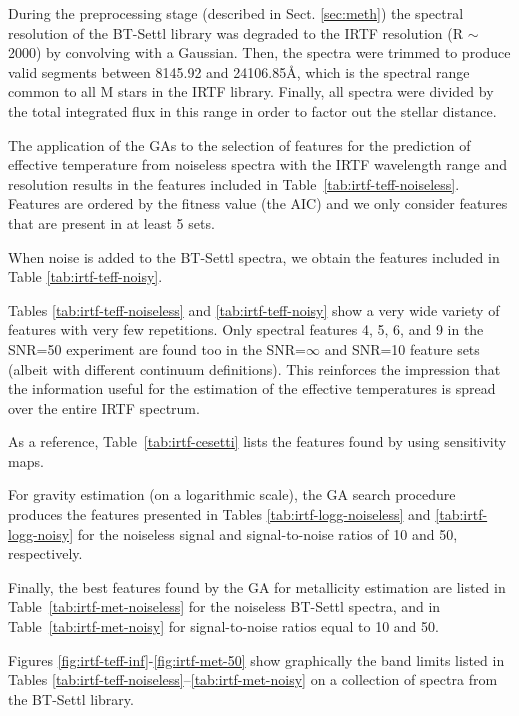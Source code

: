 
During the preprocessing stage (described in Sect. \ref{sec:meth}) the
spectral resolution of the BT-Settl library was degraded to the IRTF
resolution (R $\sim$ 2000) by convolving with a Gaussian. Then, the spectra
were trimmed to produce valid segments between 8145.92 and
24106.85{\AA}, which is the spectral range common to all M stars in
the IRTF library. Finally, all spectra were divided by the total
integrated flux in this range in order to factor out the stellar
distance.

The application of the GAs to the selection of features for the
prediction of effective temperature from noiseless spectra with the
IRTF wavelength range and resolution results in the features included
in Table~\ref{tab:irtf-teff-noiseless}. Features are ordered by the
fitness value (the AIC) and we only consider features that are present
in at least 5 sets.

When noise is added to the BT-Settl spectra, we obtain the features
included in Table \ref{tab:irtf-teff-noisy}.

Tables \ref{tab:irtf-teff-noiseless} and \ref{tab:irtf-teff-noisy}
show a very wide variety of features with very few repetitions. Only
spectral features 4, 5, 6, and 9 in the SNR=50 experiment are found
too in the SNR=$\infty$ and SNR=10 feature sets (albeit with different
continuum definitions). This reinforces the impression that the
information useful for the estimation of the effective temperatures is
spread over the entire IRTF spectrum.

As a reference, Table~\ref{tab:irtf-cesetti} lists the features found
by \cite{cesetti} using sensitivity maps.

For gravity estimation (on a logarithmic scale), the GA search
procedure produces the features presented in
Tables \ref{tab:irtf-logg-noiseless} and \ref{tab:irtf-logg-noisy} for
the noiseless signal and signal-to-noise ratios of 10 and 50,
respectively.

Finally, the best features found by the GA for metallicity estimation
are listed in Table~\ref{tab:irtf-met-noiseless} for the noiseless BT-Settl
spectra, and in Table~\ref{tab:irtf-met-noisy} for signal-to-noise
ratios equal to 10 and 50.

Figures \ref{fig:irtf-teff-inf}-\ref{fig:irtf-met-50} show
graphically the band limits listed in
Tables \ref{tab:irtf-teff-noiseless}--\ref{tab:irtf-met-noisy} on a
collection of spectra from the BT-Settl library.


